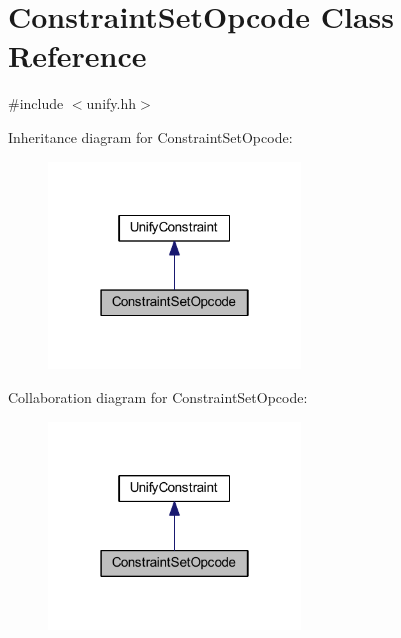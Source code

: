 \hypertarget{class_constraint_set_opcode}{}\section{Constraint\+Set\+Opcode Class Reference}
\label{class_constraint_set_opcode}


{\ttfamily \#include $<$unify.\+hh$>$}



Inheritance diagram for Constraint\+Set\+Opcode\+:
\nopagebreak
\begin{figure}[H]
\begin{center}
\leavevmode
\includegraphics[width=190pt]{class_constraint_set_opcode__inherit__graph}
\end{center}
\end{figure}


Collaboration diagram for Constraint\+Set\+Opcode\+:
\nopagebreak
\begin{figure}[H]
\begin{center}
\leavevmode
\includegraphics[width=190pt]{class_constraint_set_opcode__coll__graph}
\end{center}
\end{figure}
